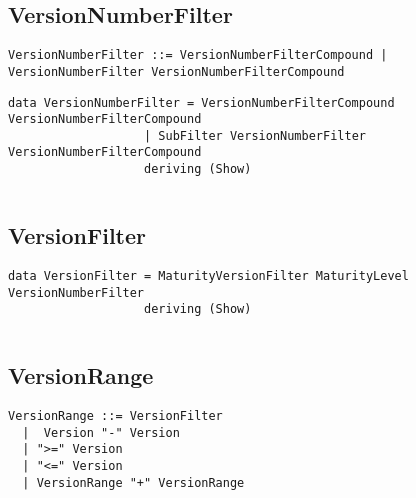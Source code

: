 \documentclass[11pt]{article}
\begin{document}
\subsection{VersionNumberFilter}

\begin{lstlisting}[caption=BNF]							
VersionNumberFilter ::= VersionNumberFilterCompound | VersionNumberFilter VersionNumberFilterCompound
\end{lstlisting}

\begin{lstlisting}
data VersionNumberFilter = VersionNumberFilterCompound VersionNumberFilterCompound
                   | SubFilter VersionNumberFilter VersionNumberFilterCompound
                   deriving (Show)
\end{lstlisting}

\begin{lstlisting}[style=Examples]

\end{lstlisting}

\subsection{VersionFilter}

\begin{lstlisting}
data VersionFilter = MaturityVersionFilter MaturityLevel VersionNumberFilter
                   deriving (Show)
\end{lstlisting}


\begin{lstlisting}[style=Examples]

\end{lstlisting}

\subsection{VersionRange}

\begin{lstlisting}[caption=BNF]
VersionRange ::= VersionFilter
  |  Version "-" Version
  | ">=" Version
  | "<=" Version
  | VersionRange "+" VersionRange
\end{lstlisting}

\begin{lstlisting}

\end{lstlisting}

\begin{lstlisting}[style=Examples]

\end{lstlisting}
\end{document}
